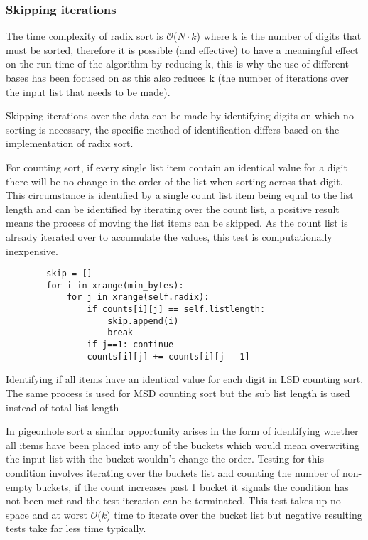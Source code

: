 \documentclass[12pt]{article}
\begin{document}
\subsubsection{Skipping iterations}
\label{sssec:skip}
The time complexity of radix sort is $\mathcal{O}${($N \cdot k$)} where k is the number of digits that must be sorted, therefore it is possible (and effective) to have a meaningful effect on the run time of the algorithm by reducing k, this is why the use of different bases has been focused on as this also reduces k (the number of iterations over the input list that needs to be made).
\par
Skipping iterations over the data can be made by identifying digits on which no sorting is necessary, the specific method of identification differs based on the implementation of radix sort.
\par
For counting sort, if every single list item contain an identical value for a digit there will be no change in the order of the list when sorting across that digit. This circumstance is identified by a single count list item being equal to the list length and can be identified by iterating over the count list, a positive result means the process of moving the list items can be skipped. As the count list is already iterated over to accumulate the values, this test is computationally inexpensive.
\begin{table}[H]
	\centering
	\begin{lstlisting}
		skip = []
		for i in xrange(min_bytes):
			for j in xrange(self.radix):
				if counts[i][j] == self.listlength:
					skip.append(i)
					break
				if j==1: continue
				counts[i][j] += counts[i][j - 1]
	\end{lstlisting}
	\caption*{Identifying if all items have an identical value for each digit in LSD counting sort. \\ The same process is used for MSD counting sort but the sub list length is used instead of total list length}
\end{table}
\par
In pigeonhole sort a similar opportunity arises in the form of identifying whether all items have been placed into any of the buckets which would mean overwriting the input list with the bucket wouldn't change the order. Testing for this condition involves iterating over the buckets list and counting the number of non-empty buckets, if the count increases past 1 bucket it signals the condition has not been met and the test iteration can be terminated. This test takes up no space and at worst $\mathcal{O}${($k$)} time to iterate over the bucket list but negative resulting tests take far less time typically.
\end{document}
